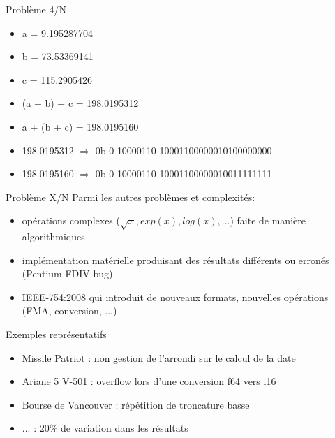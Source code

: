 \documentclass{beamer}
\begin{document}
    \begin{frame}{Problème 4/N} 
    \begin{itemize}
\item a = 9.195287704 \\
\item b = 73.53369141 \\
\item c = 115.2905426 \\
\item (a + b) + c = 198.0195312 \\
\item a + (b + c) = 198.0195160 \\
\item 198.0195312 $\Rightarrow$ 0b \textcolor{SignColor}{0} \textcolor{ExponentColor}{10000110} \textcolor{FractionColor}{10001100000010100000000}\\
\item 198.0195160 $\Rightarrow$ 0b \textcolor{SignColor}{0} \textcolor{ExponentColor}{10000110} \textcolor{FractionColor}{10001100000010011111111}
\end{itemize}
    \end{frame}
    
  \begin{frame}{Problème X/N}
  Parmi les autres problèmes et complexités: 
  \begin{itemize}
  \item opérations complexes ($\sqrt{x}, exp(x), log(x), ...$) faite de manière algorithmiques
  \item implémentation matérielle produisant des résultats différents ou erronés (Pentium FDIV bug)
  \item IEEE-754:2008 qui introduit de nouveaux formats, nouvelles opérations (FMA, conversion, ...)
  \end{itemize}
  \end{frame}
  
      \begin{frame}{Exemples représentatifs}
\begin{itemize}
\item Missile Patriot : non gestion de l'arrondi sur le calcul de la date
\item Ariane 5 V-501 : overflow lors d'une conversion f64 vers i16
\item Bourse de Vancouver : répétition de troncature basse 
\item ... : 20\% de variation dans les résultats
\end{itemize}
  \end{frame}
  
\end{document}

